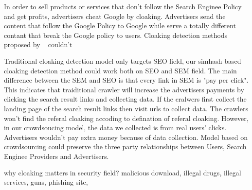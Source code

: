 In order to sell products or services that don't follow the Search Enginee Policy and get profits, advertisers cheat Google by cloaking. Advertisers send the content that follow the Google Policy to Google while serve a totally different contant that break the Google policy to users. Cloaking detection methods proposed by ~\cite{wang2011cloak} couldn't 

Traditional cloaking detection model only targets SEO field, our simhash based cloaking detection method could work both on SEO and SEM field. The main difference between the SEM and SEO is that every link in SEM is "pay per click". This indicates that  traiditional crawler will increase the advertisers payments by clicking the search result links and collecting data. If the cralwers first collect the landing page of the search result links then visit urls to collect data. The crawlers won't find the referal cloaking accoding to defination of referal cloaking. However, in our crowdsoucing model, the data we collected is from real users' clicks. Advertisers wouldn't pay extra money because of data collection. 
Model based on crowdsourcing could preserve the three party relationships between Users, Search Enginee Providers and Advertisers.

why cloaking matters in security field?
malicious download, illegal drugs, illegal services, guns, phishing site, 



